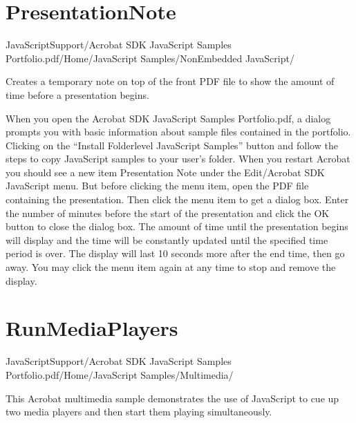 \documentclass[letterpaper,12pt,english,openany,oneside]{sphinxmanual}
\begin{document}
\section{PresentationNote}
\label{\detokenize{Samples_JavaScript:presentationnote}}\label{\detokenize{Samples_JavaScript:location-14}}

JavaScriptSupport/Acrobat SDK JavaScript Samples Portfolio.pdf/Home/JavaScript Samples/Non\sphinxhyphen{}Embedded JavaScript/

\label{\detokenize{Samples_JavaScript:description-14}}

Creates a temporary note on top of the front PDF file to show the amount of time before a presentation begins.

When you open the Acrobat SDK JavaScript Samples Portfolio.pdf, a dialog prompts you with basic information about sample files contained in the portfolio. Clicking on the “Install Folder\sphinxhyphen{}level JavaScript Samples” button and follow the steps to copy JavaScript samples to your user’s  folder. When you restart Acrobat you should see a new item Presentation Note under the Edit/Acrobat SDK JavaScript menu. But before clicking the menu item, open the PDF file containing the presentation. Then click the menu item to get a dialog box. Enter the number of minutes before the start of the presentation and click the OK button to close the dialog box. The amount of time until the presentation begins will display and the time will be constantly updated until the specified time period is over. The display will last 10 seconds more after the end time, then go away. You may click the menu item again at any time to stop and remove the display.


\section{RunMediaPlayers}
\label{\detokenize{Samples_JavaScript:runmediaplayers}}\label{\detokenize{Samples_JavaScript:location-15}}

JavaScriptSupport/Acrobat SDK JavaScript Samples Portfolio.pdf/Home/JavaScript Samples/Multimedia/

\label{\detokenize{Samples_JavaScript:description-15}}

This Acrobat multimedia sample demonstrates the use of JavaScript to cue up two media players and then start them playing simultaneously.
\end{document}
